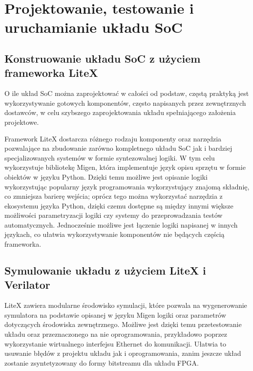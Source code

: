 \section{Projektowanie, testowanie i uruchamianie układu SoC}
\subsection{Konstruowanie układu SoC z użyciem frameworka LiteX}
O ile układ SoC można zaprojektować w całości od podstaw, częstą praktyką jest wykorzystywanie gotowych komponentów, często napisanych przez zewnętrznych dostawców, w celu szybszego zaprojektowania układu spełniającego założenia projektowe.

Framework LiteX\cite{https://doi.org/10.48550/arxiv.2005.02506} dostarcza różnego rodzaju komponenty oraz narzędzia pozwalające na zbudowanie zarówno kompletnego układu SoC jak i bardziej specjalizowanych systemów w formie syntezowalnej logiki. W tym celu wykorzystuje bibliotekę Migen, która implementuje język opisu sprzętu w formie obiektów w języku Python. Dzięki temu możliwe jest opisanie logiki wykorzystując popularny język programowania wykorzystujący znajomą składnię, co zmniejsza barierę wejścia; oprócz tego można wykorzystać narzędzia z ekosystemu języka Python, dzięki czemu dostępne są między innymi większe możliwości parametryzacji logiki czy systemy do przeprowadzania testów automatycznych. Jednocześnie możliwe jest łączenie logiki napisanej w innych językach, co ułatwia wykorzystywanie komponentów nie będących częścią frameworka.


\subsection{Symulowanie układu z użyciem LiteX i Verilator}
LiteX zawiera modularne środowisko symulacji, które pozwala na wygenerowanie symulatora na podstawie opisanej w języku Migen logiki oraz parametrów dotyczących środowiska zewnętrznego. Możliwe jest dzięki temu przetestowanie układu oraz przeznaczonego na nie oprogramowania, przykładowo poprzez wykorzystanie wirtualnego interfejsu Ethernet do komunikacji. Ułatwia to usuwanie błędów z projektu układu jak i oprogramowania, zanim jeszcze układ zostanie zsyntetyzowany do formy bitstreamu dla układu FPGA.

